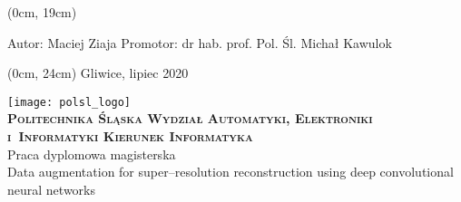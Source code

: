 \thispagestyle{empty}
\textblockorigin{3cm}{2.5cm}

\begin{onehalfspacing}
\begin{center}
    \begin{textblock*}{\textwidth}(0cm, 19cm)
	\begin{flushleft}
	Autor: Maciej Ziaja \linebreak
	Promotor: dr hab. prof. Pol. Śl. Michał Kawulok \linebreak
	\end{flushleft}
	\end{textblock*}
	\begin{textblock*}{\textwidth}(0cm, 24cm)
	\fontsize{12}{12} \selectfont
	Gliwice, lipiec 2020
	\end{textblock*}
    \vspace{2\baselineskip}
	\texttt{[image: polsl\_logo]}\\
	\vspace{2\baselineskip}
	\fontsize{18}{18} \selectfont
	\textbf{\textsc{Politechnika Śląska \linebreak
	Wydział Automatyki, Elektroniki i~Informatyki \linebreak
	Kierunek Informatyka}} \\
	\vspace{3\baselineskip}
	Praca dyplomowa magisterska \\
	\vspace{3\baselineskip}
	\fontsize{14}{14} \selectfont
	Data augmentation for super--resolution reconstruction using deep convolutional neural networks
\end{center}
\end{onehalfspacing}
\restoregeometry
